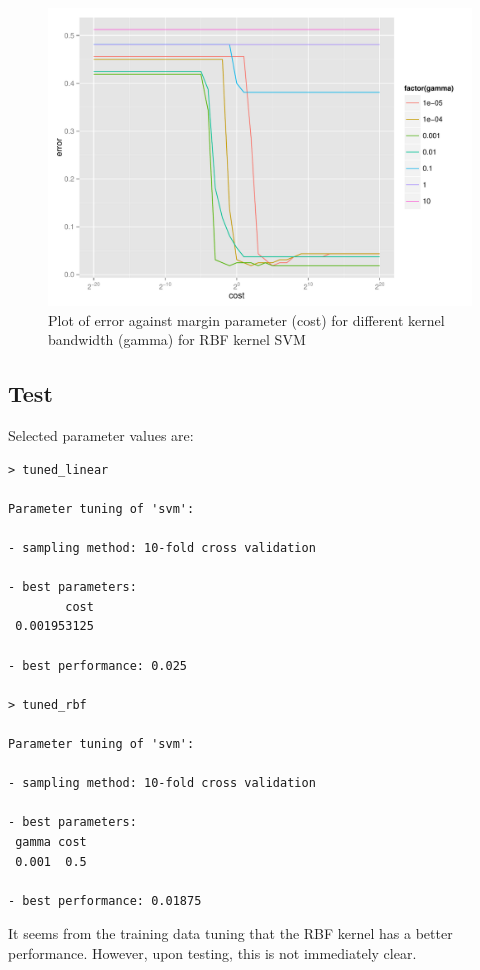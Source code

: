 \documentclass[11pt]{scrartcl}
\begin{document}
\begin{figure}[H]
\centering\includegraphics[width=\textwidth]{./hw2/r/tune_rbf.pdf}
\caption{Plot of error against margin parameter (cost) for different kernel bandwidth (gamma) for RBF kernel SVM}
\end{figure}

\subsection{Test}

Selected parameter values are:

\begin{lstlisting}
> tuned_linear

Parameter tuning of 'svm':

- sampling method: 10-fold cross validation 

- best parameters:
        cost
 0.001953125

- best performance: 0.025 

> tuned_rbf

Parameter tuning of 'svm':

- sampling method: 10-fold cross validation 

- best parameters:
 gamma cost
 0.001  0.5

- best performance: 0.01875 
\end{lstlisting}

It seems from the training data tuning that the RBF kernel has a better performance. However, upon testing, this is not immediately clear.
\end{document}

